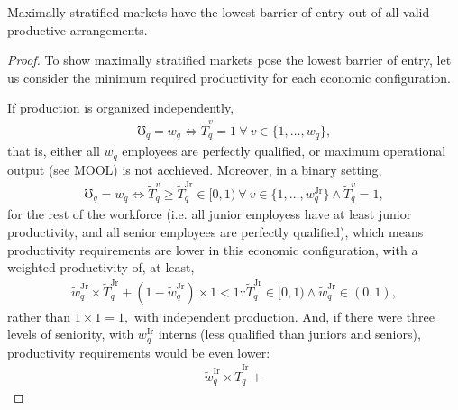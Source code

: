\documentclass[hidelinks, nonatbib]{elsarticle}
\begin{document}
\begin{lemma}
    Maximally stratified markets have the lowest barrier of entry out of all valid productive arrangements.
    
    \begin{proof}
        To show maximally stratified markets pose the lowest barrier of entry, let us consider the minimum required productivity for each economic configuration.
        
        If production is organized independently,
        \begin{gather}
        \mho_q = w_q
        \iff
        \tilde{T}_{q}^{v}
        =
        1
        \
        \forall
        \
        v \in \{1, \dots, w_q\}
        ,
        \end{gather}
        that is, either all $w_q$ employees are perfectly qualified, or maximum operational output (see MOOL) is not acchieved. Moreover, in a binary setting,
        \begin{gather}
        \mho_q = w_q
        \iff
        \tilde{T}_{q}^{v}
        \geq
        \tilde{T}_{q}^{\text{Jr}}
        \in
        [0,1)
        \
        \forall
        \
        v \in \{1, \dots, w_{q}^{\text{Jr}}\}
        \land
        \tilde{T}_{q}^{v}
        =
        1
        ,
        \end{gather}
        for the rest of the workforce (i.e. all junior employess have at least junior productivity, and all senior employees are perfectly qualified), which means productivity requirements are lower in this economic configuration, with a weighted productivity of, at least,
        \begin{gather}
        \tilde{w}_{q}^{\text{Jr}}
        \times
        \tilde{T}_{q}^{\text{Jr}}
        +
        (
            1 - \tilde{w}_{q}^{\text{Jr}}
        )
        \times
        1
        <
        1
        \because
        \tilde{T}_{q}^{\text{Jr}}
        \in
        [0,1)
        \land
        \tilde{w}_{q}^{\text{Jr}}
        \in
        (0,1)
        ,
        \end{gather}
        rather than $1 \times 1 = 1,$ with independent production. And, if there were three levels of seniority, with $w_{q}^{\text{Ir}}$ interns (less qualified than juniors and seniors), productivity requirements would be even lower:
        \begin{align}
        \tilde{w}_{q}^{\text{Ir}}
        \times
        \tilde{T}_{q}^{\text{Ir}}
        +

\end{align}
\end{proof}
\end{lemma}
\end{document}
